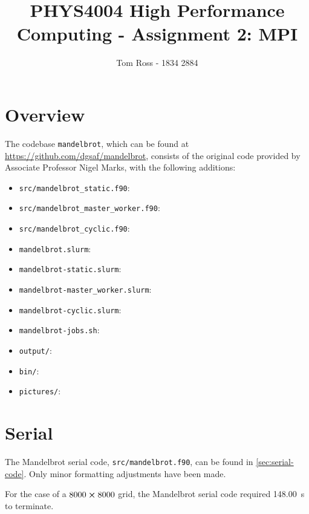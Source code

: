 \documentclass{article}
\title{PHYS4004 High Performance Computing - Assignment 2: MPI}
\author{Tom Ross - 1834 2884}
\date{}
\begin{document}
\tableofcontents

\newpage
\section{Overview}
\label{sec:overview}

The codebase \lstinline[style=ff]{mandelbrot}, which can be found at
\url{https://github.com/dgsaf/mandelbrot}, consists of the original code
provided by Associate Professor Nigel Marks, with the following additions:
\begin{itemize}
\item \lstinline[style=ff]{src/mandelbrot_static.f90}:

\item \lstinline[style=ff]{src/mandelbrot_master_worker.f90}:

\item \lstinline[style=ff]{src/mandelbrot_cyclic.f90}:

\item \lstinline[style=ff]{mandelbrot.slurm}:

\item \lstinline[style=ff]{mandelbrot-static.slurm}:

\item \lstinline[style=ff]{mandelbrot-master_worker.slurm}:

\item \lstinline[style=ff]{mandelbrot-cyclic.slurm}:

\item \lstinline[style=ff]{mandelbrot-jobs.sh}:

\item \lstinline[style=ff]{output/}:

\item \lstinline[style=ff]{bin/}:

\item \lstinline[style=ff]{pictures/}:

\end{itemize}

\clearpage
\section{Serial}
\label{sec:serial}

The Mandelbrot serial code, \lstinline[style=ff]{src/mandelbrot.f90}, can be
found in \autoref{sec:serial-code}.
Only minor formatting adjustments have been made.

For the case of a $8000 \cross 8000$ grid, the Mandelbrot serial code required
\SI{148.00}{\second} to terminate.
\end{document}
